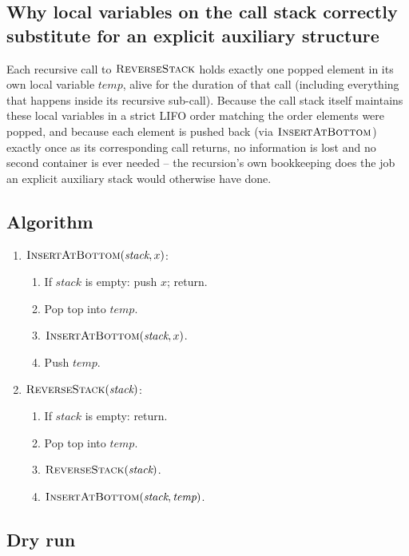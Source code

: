 \subsection*{Why local variables on the call stack correctly substitute for an explicit auxiliary structure}

Each recursive call to $\textsc{ReverseStack}$ holds exactly one
popped element in its own local variable $\textit{temp}$, alive for the
duration of that call (including everything that happens inside its
recursive sub-call). Because the call stack itself maintains these
local variables in a strict LIFO order matching the order elements were
popped, and because each element is pushed back (via
$\textsc{InsertAtBottom}$) exactly once as its corresponding call
returns, no information is lost and no second container is ever needed
-- the recursion's own bookkeeping does the job an explicit auxiliary
stack would otherwise have done.

\subsection*{Algorithm}

\begin{enumerate}
  \item $\textsc{InsertAtBottom}(\textit{stack}, x)$:
  \begin{enumerate}
    \item If $\textit{stack}$ is empty: push $x$; return.
    \item Pop top into $\textit{temp}$.
    \item $\textsc{InsertAtBottom}(\textit{stack}, x)$.
    \item Push $\textit{temp}$.
  \end{enumerate}
  \item $\textsc{ReverseStack}(\textit{stack})$:
  \begin{enumerate}
    \item If $\textit{stack}$ is empty: return.
    \item Pop top into $\textit{temp}$.
    \item $\textsc{ReverseStack}(\textit{stack})$.
    \item $\textsc{InsertAtBottom}(\textit{stack}, \textit{temp})$.
  \end{enumerate}
\end{enumerate}

\subsection*{Dry run}

